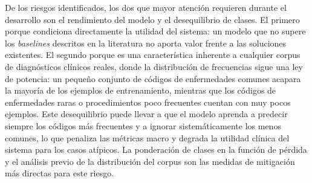 De los riesgos identificados, los dos que mayor atención requieren durante el desarrollo son el rendimiento del modelo y el desequilibrio de clases. El primero porque condiciona directamente la utilidad del sistema: un modelo que no supere los \emph{baselines} descritos en la literatura no aporta valor frente a las soluciones existentes. El segundo porque es una característica inherente a cualquier corpus de diagnósticos clínicos reales, donde la distribución de frecuencias sigue una ley de potencia: un pequeño conjunto de códigos de enfermedades comunes acapara la mayoría de los ejemplos de entrenamiento, mientras que los códigos de enfermedades raras o procedimientos poco frecuentes cuentan con muy pocos ejemplos. Este desequilibrio puede llevar a que el modelo aprenda a predecir siempre los códigos más frecuentes y a ignorar sistemáticamente los menos comunes, lo que penaliza las métricas macro y degrada la utilidad clínica del sistema para los casos atípicos. La ponderación de clases en la función de pérdida y el análisis previo de la distribución del corpus son las medidas de mitigación más directas para este riesgo.
